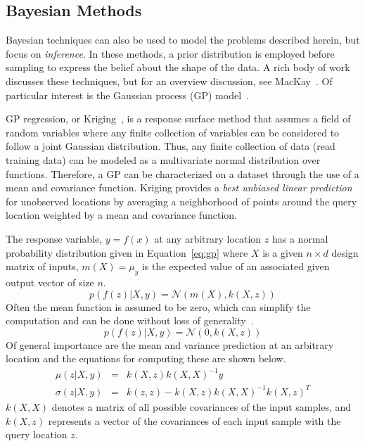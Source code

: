 \subsection{Bayesian Methods}

Bayesian techniques can also be used to model the problems described herein, but focus on \emph{inference}.
%
In these methods, a prior distribution is employed before sampling to express the belief about the shape of the data.
%
A rich body of work discusses these techniques, but for an overview discussion, see MacKay~\cite{MacKay1992b}.
%
Of particular interest is the Gaussian process (GP) model~\cite{RasmussenWilliams2006}.

GP regression, or Kriging~\cite{Stein1999}, is a response surface method that assumes a field of random variables where any finite collection of variables can be considered to follow a joint Gaussian distribution.
%
Thus, any finite collection of data (read training data) can be modeled as a multivariate normal distribution over functions.
%
Therefore, a GP can be characterized on a dataset through the use of a mean and covariance function.
%
Kriging provides a \emph{best unbiased linear prediction} for unobserved locations by averaging a neighborhood of points around the query location weighted by a mean and covariance function.

The response variable, $y=f(x)$ at any arbitrary location $z$ has a normal probability distribution given in Equation~\ref{eq:gp} where $X$ is a given $n \times d$ design matrix of inputs, $m(X) = \mu_y$ is the expected value of an associated given output vector of size $n$.
%
\begin{equation}
p(f(z)|X,y) = \mathcal{N}(m(X),k(X,z))
\label{eq:gp}
\end{equation}
%
Often the mean function is assumed to be zero, which can simplify the computation and can be done without loss of generality~\cite{Seeger2004}.
%
\begin{equation}
p(f(z)|X,y) = \mathcal{N}(0,k(X,z))
\label{eq:gpSimple}
\end{equation}
%
Of general importance are the mean and variance prediction at an arbitrary location and the equations for computing these are shown below.
%
\begin{eqnarray}
\mu(z|X,y) & = & k(X,z)k(X,X)^{-1}y\\
\sigma(z|X,y) & = & k(z,z) - k(X,z)k(X,X)^{-1}k(X,z)^T
\end{eqnarray}
%
$k(X,X)$ denotes a matrix of all possible covariances of the input samples, and $k(X,z)$ represents a vector of the covariances of each input sample with the query location $z$.

